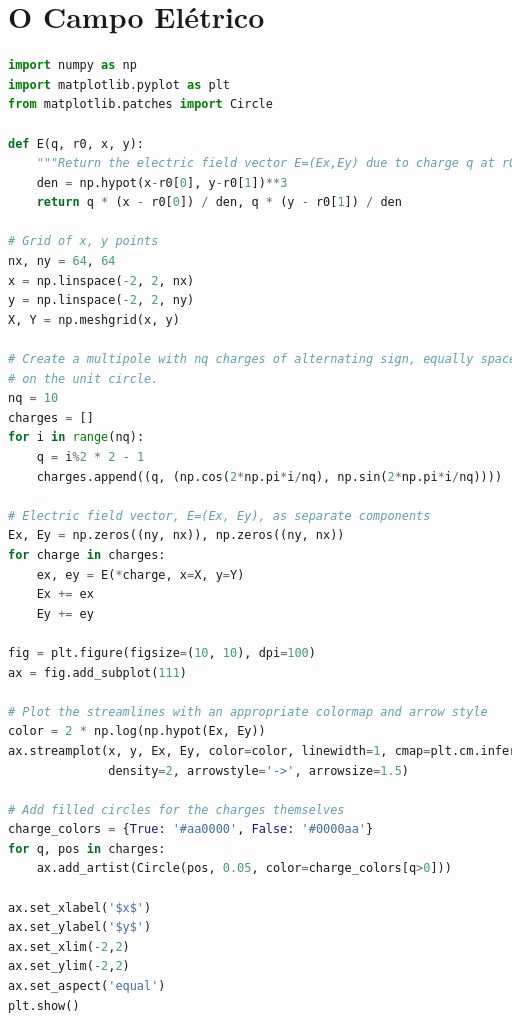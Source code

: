 \chapter{O Campo Elétrico}

\begin{lstlisting}[language=Python, frame=lines,basicstyle=\footnotesize, caption={Linhas de campo de um multipolo.}, label={lst:Multipole}]
import numpy as np
import matplotlib.pyplot as plt
from matplotlib.patches import Circle

def E(q, r0, x, y):
    """Return the electric field vector E=(Ex,Ey) due to charge q at r0."""
    den = np.hypot(x-r0[0], y-r0[1])**3
    return q * (x - r0[0]) / den, q * (y - r0[1]) / den

# Grid of x, y points
nx, ny = 64, 64
x = np.linspace(-2, 2, nx)
y = np.linspace(-2, 2, ny)
X, Y = np.meshgrid(x, y)

# Create a multipole with nq charges of alternating sign, equally spaced
# on the unit circle.
nq = 10
charges = []
for i in range(nq):
    q = i%2 * 2 - 1
    charges.append((q, (np.cos(2*np.pi*i/nq), np.sin(2*np.pi*i/nq))))

# Electric field vector, E=(Ex, Ey), as separate components
Ex, Ey = np.zeros((ny, nx)), np.zeros((ny, nx))
for charge in charges:
    ex, ey = E(*charge, x=X, y=Y)
    Ex += ex
    Ey += ey

fig = plt.figure(figsize=(10, 10), dpi=100)
ax = fig.add_subplot(111)

# Plot the streamlines with an appropriate colormap and arrow style
color = 2 * np.log(np.hypot(Ex, Ey))
ax.streamplot(x, y, Ex, Ey, color=color, linewidth=1, cmap=plt.cm.inferno,
              density=2, arrowstyle='->', arrowsize=1.5)

# Add filled circles for the charges themselves
charge_colors = {True: '#aa0000', False: '#0000aa'}
for q, pos in charges:
    ax.add_artist(Circle(pos, 0.05, color=charge_colors[q>0]))

ax.set_xlabel('$x$')
ax.set_ylabel('$y$')
ax.set_xlim(-2,2)
ax.set_ylim(-2,2)
ax.set_aspect('equal')
plt.show()
\end{lstlisting}

